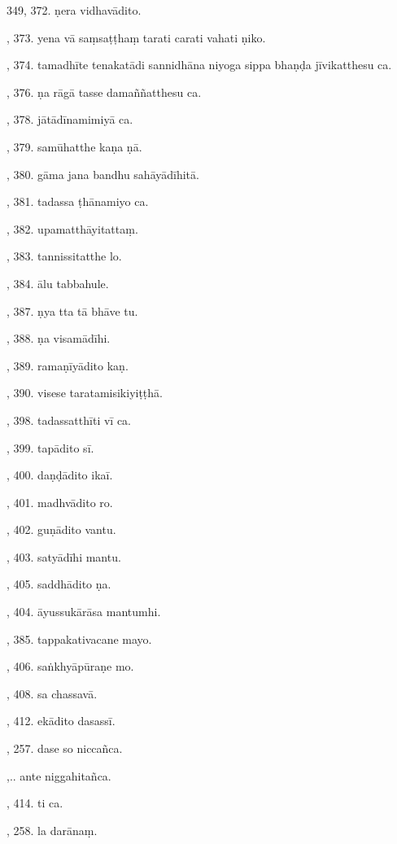 349, 372. ṇera vidhavādito.\par {}, 373. yena vā saṃsaṭṭhaṃ tarati carati vahati ṇiko.\par {}, 374. tamadhīte tenakatādi sannidhāna niyoga sippa bhaṇḍa jīvikatthesu ca.\par {}, 376. ṇa rāgā tasse damaññatthesu ca.\par {}, 378. jātādīnamimiyā ca.\par {}, 379. samūhatthe kaṇa ṇā.\par {}, 380. gāma jana bandhu sahāyādīhitā.\par {}, 381. tadassa ṭhānamiyo ca.\par {}, 382. upamatthāyitattaṃ.\par {}, 383. tannissitatthe lo.\par {}, 384. ālu tabbahule.\par {}, 387. ṇya tta tā bhāve tu.\par {}, 388. ṇa visamādīhi.\par {}, 389. ramaṇīyādito kaṇ.\par {}, 390. visese taratamisikiyiṭṭhā.\par {}, 398. tadassatthīti vī ca.\par {}, 399. tapādito sī.\par {}, 400. daṇḍādito ikaī.\par {}, 401. madhvādito ro.\par {}, 402. guṇādito vantu.\par {}, 403. satyādīhi mantu.\par {}, 405. saddhādito ṇa.\par {}, 404. āyussukārāsa mantumhi.\par {}, 385. tappakativacane mayo.\par {}, 406. saṅkhyāpūraṇe mo.\par {}, 408. sa chassavā.\par {}, 412. ekādito dasassī.\par {}, 257. dase so niccañca.\par {},.. ante niggahitañca.\par {}, 414. ti ca.\par {}, 258. la darānaṃ.\par \noindent
